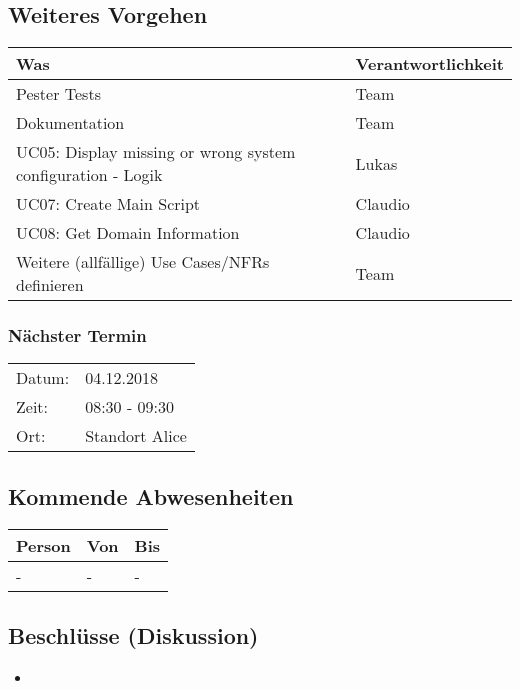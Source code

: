 \vspace{1cm}

\subsection*{Weiteres Vorgehen}
\begin{table}[H]
    \centering
    \begin{tabular}{p{12cm} p{4cm}}
        \textbf{Was} & \textbf{Verantwortlichkeit} \\ \hline
        Pester Tests & Team \\ \hline
        Dokumentation & Team\\ \hline
        UC05: Display missing or wrong system configuration - Logik & Lukas \\ \hline
        UC07: Create Main Script & Claudio \\ \hline
        UC08: Get Domain Information & Claudio \\ \hline
        Weitere (allfällige) Use Cases/NFRs definieren & Team\\ \hline
    \end{tabular}
\end{table}

\clearpage

\subsubsection*{Nächster Termin}

\begin{tabular}{p{4cm} p{12cm}}
    Datum: & 04.12.2018 \\
    Zeit: & 08:30 - 09:30 \\
    Ort: & Standort Alice \\
\end{tabular}

\vspace{1cm}

\subsection*{Kommende Abwesenheiten}
\begin{table}[H]
    \centering
    \begin{tabular}{p{6cm} p{5cm} p{5cm}}
        \textbf{Person} & \textbf{Von} & \textbf{Bis} \\ \hline
        - & - & - \\ \hline
    \end{tabular}
\end{table}

\vspace{1cm}

\subsection*{Beschlüsse (Diskussion)}
\begin{itemize}
    \item 
\end{itemize}

